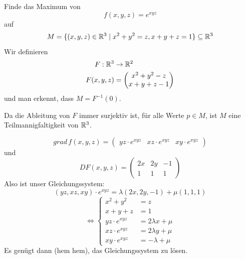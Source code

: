 \documentclass[main.tex]{subfiles}
\begin{document}
\begin{Beispiel}
  Finde das Maximum von
  $$f(x,y,z) = e^{xyz}$$
  auf
  $$M = \{(x,y,z) \in \mathbb{R}^3 \mid x^2+y^2 = z, x+y+z = 1\} \subseteq \mathbb{R}^3$$
  Wir definieren
  $$\begin{aligned}
    F : \mathbb{R}^3 & \to \mathbb{R}^2 \\
    F(x,y,z) & = \begin{pmatrix}
      x^2 + y^2 - z \\ x + y + z - 1
    \end{pmatrix}
  \end{aligned}$$
  und man erkennt, dass $M = F^{-1}(0)$.

  Da die Ableitung von $F$ immer surjektiv ist, für alle Werte $p \in M$, ist $M$ eine Teilmannigfaltigkeit von $\mathbb{R}^3$.

  $$grad \, f(x,y,z) = \begin{pmatrix}
    yz \cdot e^{xyz} & xz \cdot e^{xyz} & xy \cdot e^{xyz}
  \end{pmatrix}$$
  und
  $$DF(x,y,z) = \begin{pmatrix}
    2x & 2y & -1 \\
    1 & 1 & 1
  \end{pmatrix}$$
  Also ist unser Gleichungssystem:
  $$(yz,xz,xy) \cdot e^{xyz} = \lambda(2x,2y,-1) + \mu(1,1,1)$$
  $$\Leftrightarrow \left \{ \begin{aligned}
      x^2 + y^2 & = z \\
      x + y + z & = 1 \\
      yz \cdot e^{xyz} & = 2 \lambda x + \mu \\
      xz \cdot e^{xyz} & = 2 \lambda y + \mu \\
      xy \cdot e^{xyz} & = - \lambda + \mu
    \end{aligned}\right.$$
  Es genügt dann (hem hem), das Gleichungssystem zu lösen.
\end{Beispiel}
\end{document}
